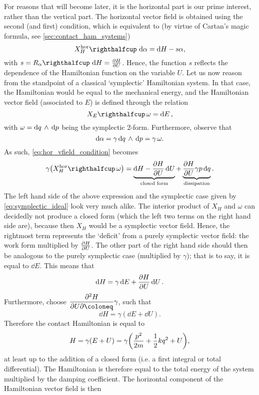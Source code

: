 For reasons that will become later, it is the horizontal part is our prime interest, rather than the vertical part. The horizontal vector field is obtained using the second (and first) condition, which is equivalent to (by virtue of Cartan's magic formula, see \cref{sec:contact_ham_systems})
\begin{equation}
    \intpr{X_H^\text{hor}}{\dd{\alpha}} = \dd{H} - s \alpha, 
    \label{eq:hor_vfield_condition}
\end{equation}
with $s = \intpr{R_\alpha}{\dd{H}} = \pdv{H}{U}$. Hence, the function $s$ reflects the dependence of the Hamiltonian function on the variable $U$. Let us now reason from the standpoint of a classical `symplectic' Hamiltonian system. In that case, the Hamiltonian would be equal to the mechanical energy, and the Hamiltonian vector field (associated to $E$) is defined through the relation
\begin{equation}
    \intpr{X_E}{\omega} = \dd{E}, 
    \label{eq:symplectic_ideal}
\end{equation}
with $\omega =  \dd{q}\,\wedge\,\dd{p} $ being the symplectic 2-form. Furthermore, observe that 
$$
    \dd{\alpha} = \gamma  \dd{q}\,\wedge\,\dd{p}  = \gamma\,\omega. 
$$
As such, \cref{eq:hor_vfield_condition} becomes
$$
    \gamma \qty( \intpr{X_H^\text{hor}}{\omega} ) = \underbrace{\dd{H} - \pdv{H}{U}\dd{U}}_\text{closed form} + \underbrace{\pdv{H}{U} \gamma p\dd{q}}_\text{dissipation}.
$$
The left hand side of the above expression and the symplectic case given by \cref{eq:symplectic_ideal} look very much alike. The interior product of $X_H$ and $\omega$ can decidedly not produce a closed form (which the left two terms on the right hand side are), because then $X_H$ would be a symplectic vector field. Hence, the rightmost term represents the `deficit' from a purely symplectic vector field: the work form multiplied by $\pdv{H}{U}$. The other part of the right hand side should then be analogous to the purely symplectic case (multiplied by $\gamma$); that is to say, it is equal to $\dd{E}$. This means that 
$$ \dd{H}  = \gamma \dd{E} + \pdv{H}{U}\dd{U}. $$
Furthermore, choose $ \displaystyle \pdv{H}{U} \coloneq \gamma $, such that
$$ \dd{H} = \gamma (\dd{E} + \dd{U}). $$
Therefore the contact Hamiltonian is equal to
\begin{equation}
    H = \gamma (E + U) = \gamma \qty(\frac{p^2}{2m} + \frac{1}{2}kq^2 + U), 
\end{equation}
at least up to the addition of a closed form (i.e. a first integral or total differential). The Hamiltonian is therefore equal to the total energy of the system multiplied by the damping coefficient. The horizontal component of the Hamiltonian vector field is then

